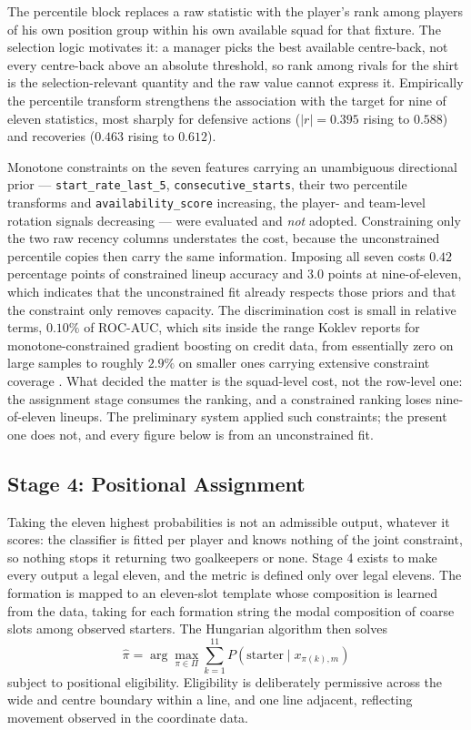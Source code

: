 \documentclass[conference]{IEEEtran}
\begin{document}
The percentile block replaces a raw statistic with the player's rank among players of his own position group within his own available squad for that fixture. The selection logic motivates it: a manager picks the best available centre-back, not every centre-back above an absolute threshold, so rank among rivals for the shirt is the selection-relevant quantity and the raw value cannot express it. Empirically the percentile transform strengthens the association with the target for nine of eleven statistics, most sharply for defensive actions ($|r| = 0.395$ rising to $0.588$) and recoveries ($0.463$ rising to $0.612$).

Monotone constraints on the seven features carrying an unambiguous directional prior --- \texttt{start\_rate\_last\_5}, \texttt{consecutive\_starts}, their two percentile transforms and \texttt{availability\_score} increasing, the player- and team-level rotation signals decreasing --- were evaluated and \emph{not} adopted. Constraining only the two raw recency columns understates the cost, because the unconstrained percentile copies then carry the same information. Imposing all seven costs $0.42$ percentage points of constrained lineup accuracy and $3.0$ points at nine-of-eleven, which indicates that the unconstrained fit already respects those priors and that the constraint only removes capacity. The discrimination cost is small in relative terms, $0.10\%$ of ROC-AUC, which sits inside the range Koklev reports for monotone-constrained gradient boosting on credit data, from essentially zero on large samples to roughly $2.9\%$ on smaller ones carrying extensive constraint coverage \cite{koklev2025}. What decided the matter is the squad-level cost, not the row-level one: the assignment stage consumes the ranking, and a constrained ranking loses nine-of-eleven lineups. The preliminary system applied such constraints; the present one does not, and every figure below is from an unconstrained fit.

\subsection{Stage 4: Positional Assignment}

Taking the eleven highest probabilities is not an admissible output, whatever it scores: the classifier is fitted per player and knows nothing of the joint constraint, so nothing stops it returning two goalkeepers or none. Stage 4 exists to make every output a legal eleven, and the metric is defined only over legal elevens. The formation is mapped to an eleven-slot template whose composition is learned from the data, taking for each formation string the modal composition of coarse slots among observed starters. The Hungarian algorithm then solves
\begin{equation}
\hat{\pi} = \arg\max_{\pi \in \Pi} \sum_{k=1}^{11} P\left(\text{starter} \mid x_{\pi(k),m}\right)
\label{eq:hungarian}
\end{equation}
subject to positional eligibility. Eligibility is deliberately permissive across the wide and centre boundary within a line, and one line adjacent, reflecting movement observed in the coordinate data.
\end{document}
